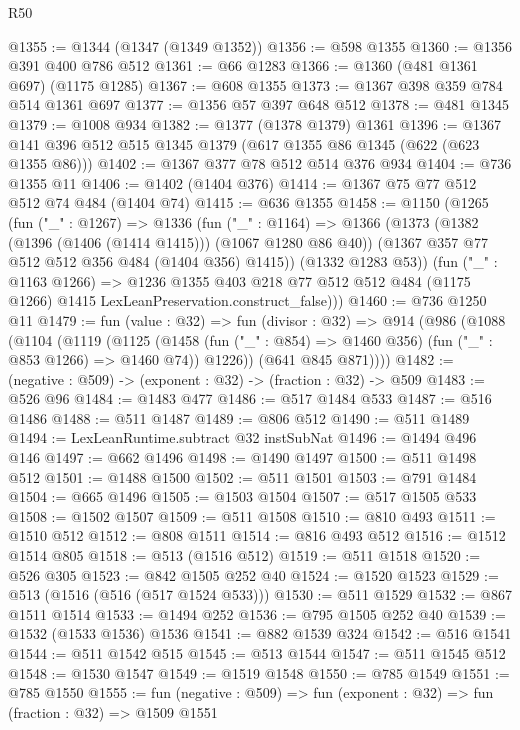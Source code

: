 \begin{lexlean}{R50}
\begin{coremodule}
@1355 := @1344 (@1347 (@1349 @1352))
@1356 := @598 @1355
@1360 := @1356 @391 @400 @786 @512
@1361 := @66 @1283
@1366 := @1360 (@481 @1361 @697) (@1175 @1285)
@1367 := @608 @1355
@1373 := @1367 @398 @359 @784 @514 @1361 @697
@1377 := @1356 @57 @397 @648 @512
@1378 := @481 @1345
@1379 := @1008 @934
@1382 := @1377 (@1378 @1379) @1361
@1396 := @1367 @141 @396 @512 @515 @1345 @1379 (@617 @1355 @86 @1345 (@622 (@623 @1355 @86)))
@1402 := @1367 @377 @78 @512 @514 @376 @934
@1404 := @736 @1355 @11
@1406 := @1402 (@1404 @376)
@1414 := @1367 @75 @77 @512 @512 @74 @484 (@1404 @74)
@1415 := @636 @1355
@1458 := @1150
    (@1265
      (fun ("_" : @1267) =>
      @1336
        (fun ("_" : @1164) =>
        @1366
          (@1373
            (@1382 (@1396 (@1406 (@1414 @1415))) (@1067 @1280 @86 @40))
            (@1367 @357 @77 @512 @512 @356 @484 (@1404 @356) @1415))
          (@1332 @1283 @53))
        (fun ("_" : @1163 @1266) =>
        @1236
          @1355
          @403
          @218
          @77
          @512
          @512
          @484
          (@1175 @1266)
          @1415
          LexLeanPreservation.construct_false)))
@1460 := @736 @1250 @11
@1479 := fun (value : @32) =>
  fun (divisor : @32) =>
  @914
    (@986
      (@1088
        (@1104
          (@1119
            (@1125
              (@1458 (fun ("_" : @854) => @1460 @356) (fun ("_" : @853 @1266) => @1460 @74))
              @1226))
          (@641 @845 @871))))
@1482 := (negative : @509) -> (exponent : @32) -> (fraction : @32) -> @509
@1483 := @526 @96
@1484 := @1483 @477
@1486 := @517 @1484 @533
@1487 := @516 @1486
@1488 := @511 @1487
@1489 := @806 @512
@1490 := @511 @1489
@1494 := LexLeanRuntime.subtract @32 instSubNat
@1496 := @1494 @496 @146
@1497 := @662 @1496
@1498 := @1490 @1497
@1500 := @511 @1498 @512
@1501 := @1488 @1500
@1502 := @511 @1501
@1503 := @791 @1484
@1504 := @665 @1496
@1505 := @1503 @1504
@1507 := @517 @1505 @533
@1508 := @1502 @1507
@1509 := @511 @1508
@1510 := @810 @493
@1511 := @1510 @512
@1512 := @808 @1511
@1514 := @816 @493 @512
@1516 := @1512 @1514 @805
@1518 := @513 (@1516 @512)
@1519 := @511 @1518
@1520 := @526 @305
@1523 := @842 @1505 @252 @40
@1524 := @1520 @1523
@1529 := @513 (@1516 (@516 (@517 @1524 @533)))
@1530 := @511 @1529
@1532 := @867 @1511 @1514
@1533 := @1494 @252
@1536 := @795 @1505 @252 @40
@1539 := @1532 (@1533 @1536) @1536
@1541 := @882 @1539 @324
@1542 := @516 @1541
@1544 := @511 @1542 @515
@1545 := @513 @1544
@1547 := @511 @1545 @512
@1548 := @1530 @1547
@1549 := @1519 @1548
@1550 := @785 @1549
@1551 := @785 @1550
@1555 := fun (negative : @509) => fun (exponent : @32) => fun (fraction : @32) => @1509 @1551

\end{coremodule}
\end{lexlean}
